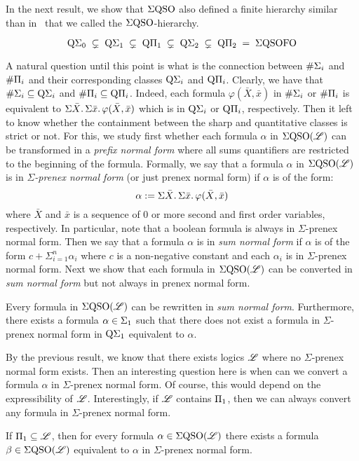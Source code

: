 In the next result, we show that $\Sigma{\rm QSO}$ also defined a finite hierarchy similar than in~\cite{SalujaST95} that we called the $\Sigma{\rm QSO}$-hierarchy.
\begin{proposition}
\[
\operatorname{Q}\!\Sigma_{0} \; \subsetneq \; \operatorname{Q}\!\Sigma_{1} \; \subsetneq \; \operatorname{Q}\!\Pi_{1} \; \subsetneq \; \operatorname{Q}\!\Sigma_{2} \; \subsetneq \; \operatorname{Q}\!\Pi_{2} \; = \; \Sigma{\rm QSO}{{\rm FO}} 
\]
\end{proposition}
A natural question until this point is what is the connection between $\#\Sigma_{i}$ and $\#\Pi_{i}$ and their corresponding classes $\operatorname{Q}\!\Sigma_{i}$ and $\operatorname{Q}\!\Pi_{i}$. Clearly, we have that $\#\Sigma_{i} \subseteq \operatorname{Q}\!\Sigma_{i}$ and $\#\Pi_{i} \subseteq \operatorname{Q}\!\Pi_{i}$. Indeed, each formula $\varphi(\bar{X}, \bar{x})$ in $\#\Sigma_{i}$ or $\#\Pi_{i}$ is equivalent to $\Sigma{\bar X}.\, \Sigma{\bar x}.\, \varphi(\bar{X}, \bar{x})$ which is in $\operatorname{Q}\!\Sigma_{i}$ or $\operatorname{Q}\!\Pi_{i}$, respectively. 
Then it left to know whether the containment between the sharp and quantitative classes is strict or not. 
For this, we study first whether each formula $\alpha$ in $\Sigma{\rm QSO}(\mathscr{L})$ can be transformed in a \emph{prefix normal form} where all sums quantifiers are restricted to the beginning of the formula. 
Formally, we say that a formula $\alpha$ in $\Sigma{\rm QSO}(\mathscr{L})$ is in \emph{$\Sigma$-prenex normal form} (or just prenex normal form) if $\alpha$ is of the form:
\[
\alpha := \Sigma{\bar{X}}.\, \Sigma{\bar{x}}.\, \varphi(\bar{X}, \bar{x})
\]
where $\bar{X}$ and $\bar{x}$ is a sequence of $0$ or more second and first order variables, respectively.
In particular, note that a boolean formula is always in $\Sigma$-prenex normal form.
Then we say that a formula $\alpha$ is in \emph{sum normal form} if $\alpha$ is of the form $c + \Sigma_{i=1}^n \alpha_i$ where $c$ is a non-negative constant and each $\alpha_i$ is in $\Sigma$-prenex normal form.
Next we show that each formula in $\Sigma{\rm QSO}(\mathscr{L})$ can be converted in \emph{sum normal form} but not always in prenex normal form.
\begin{theorem}
	Every formula in $\Sigma{\rm QSO}(\mathscr{L})$ can be rewritten in \emph{sum normal form}. Furthermore, there exists a formula $\alpha \in \Sigma_{1}$ such that there does not exist a formula in $\Sigma$-prenex normal form in $\operatorname{Q}\!\Sigma_{1}$ equivalent to $\alpha$.
\end{theorem}

By the previous result, we know that there exists logics $\mathscr{L}$ where no $\Sigma$-prenex normal form exists. 
Then an interesting question here is when can we convert a formula $\alpha$ in $\Sigma$-prenex normal form. 
Of course, this would depend on the expressibility of $\mathscr{L}$.
Interestingly, if $\mathscr{L}$ contains $\Pi_{1}$, then we can always convert any formula in $\Sigma$-prenex normal form. 
\begin{theorem}
	If $\Pi_{1} \subseteq \mathscr{L}$, then for every formula $\alpha \in \Sigma{\rm QSO}(\mathscr{L})$ there exists a formula $\beta \in \Sigma{\rm QSO}(\mathscr{L})$ equivalent to $\alpha$ in $\Sigma$-prenex normal form.
\end{theorem}

